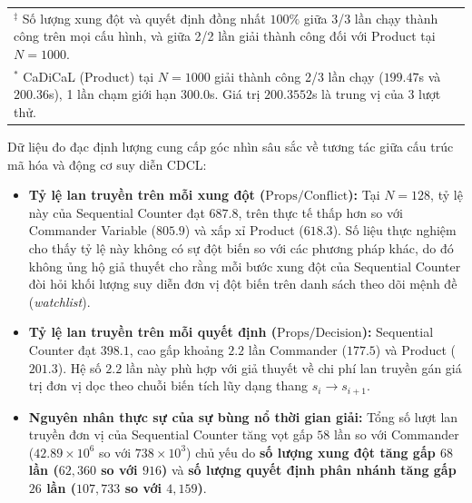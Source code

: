 \documentclass[11pt,a4paper]{article}
\begin{document}
\begin{enumerate}
\begin{table}[htbp]
{\begin{tabular}{llr rrrr rrrr}
\bottomrule
\multicolumn{11}{l}{\footnotesize $^\ddagger$ Số lượng xung đột và quyết định đồng nhất $100\%$ giữa 3/3 lần chạy thành công trên mọi cấu hình, và giữa 2/2 lần giải thành công đối với Product tại $N=1000$.} \\
\multicolumn{11}{l}{\footnotesize $^*$ CaDiCaL (Product) tại $N=1000$ giải thành công 2/3 lần chạy ($199.47$s và $200.36$s), 1 lần chạm giới hạn 300.0s. Giá trị $200.3552$s là trung vị của 3 lượt thử.} \\
\end{tabular}%
}
\end{table}

    Dữ liệu đo đạc định lượng cung cấp góc nhìn sâu sắc về tương tác giữa cấu trúc mã hóa và động cơ suy diễn CDCL:
    \begin{itemize}
        \item \textbf{Tỷ lệ lan truyền trên mỗi xung đột ($\text{Props} / \text{Conflict}$):} Tại $N=128$, tỷ lệ này của Sequential Counter đạt $687.8$, trên thực tế thấp hơn so với Commander Variable ($805.9$) và xấp xỉ Product ($618.3$). Số liệu thực nghiệm cho thấy tỷ lệ này không có sự đột biến so với các phương pháp khác, do đó không ủng hộ giả thuyết cho rằng mỗi bước xung đột của Sequential Counter đòi hỏi khối lượng suy diễn đơn vị đột biến trên danh sách theo dõi mệnh đề (\textit{watchlist}).
        \item \textbf{Tỷ lệ lan truyền trên mỗi quyết định ($\text{Props} / \text{Decision}$):} Sequential Counter đạt $398.1$, cao gấp khoảng $2.2$ lần Commander ($177.5$) và Product ($201.3$). Hệ số $2.2$ lần này phù hợp với giả thuyết về chi phí lan truyền gán giá trị đơn vị dọc theo chuỗi biến tích lũy dạng thang $s_i \to s_{i+1}$.
        \item \textbf{Nguyên nhân thực sự của sự bùng nổ thời gian giải:} Tổng số lượt lan truyền đơn vị của Sequential Counter tăng vọt gấp $58$ lần so với Commander ($42.89 \times 10^6$ so với $738 \times 10^3$) chủ yếu do \textbf{số lượng xung đột tăng gấp $68$ lần ($62{,}360$ so với $916$)} và \textbf{số lượng quyết định phân nhánh tăng gấp $26$ lần ($107{,}733$ so với $4{,}159$)}.
    \end{itemize}

\end{enumerate}
\end{document}
